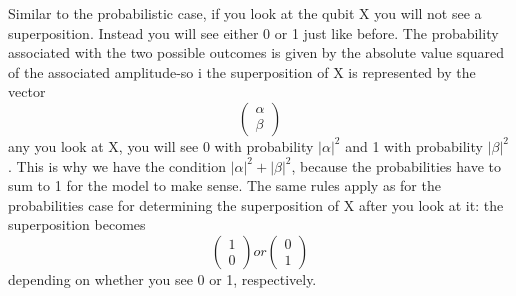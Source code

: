 \documentclass[12pt, oneside]{book}
\theoremstyle{definition}
\theoremstyle{definition}
\theoremstyle{remark}
\begin{document}
Similar to the probabilistic case, if you look at the qubit X you will not see a superposition. Instead you will see either 0 or 1 just like before. The probability associated with the two possible outcomes is given by the absolute value squared of the associated amplitude-so i the superposition of X is represented by the vector
\[
\begin{pmatrix} \alpha \\ \beta \end{pmatrix}
\]
any you look at X, you will see 0 with probability $|\alpha|^2$ and 1 with probability $|\beta|^2$. This is why we have the condition $|\alpha|^2+|\beta|^2$, because the probabilities have to sum to 1 for the model to make sense. The same rules apply as for the probabilities case for determining the superposition of X after you look at it: the superposition becomes
\[
\begin{pmatrix} 1 \\ 0 \end{pmatrix} or \begin{pmatrix} 0 \\1 \end{pmatrix}
\]
depending on whether you see 0 or 1, respectively.
\end{document}
